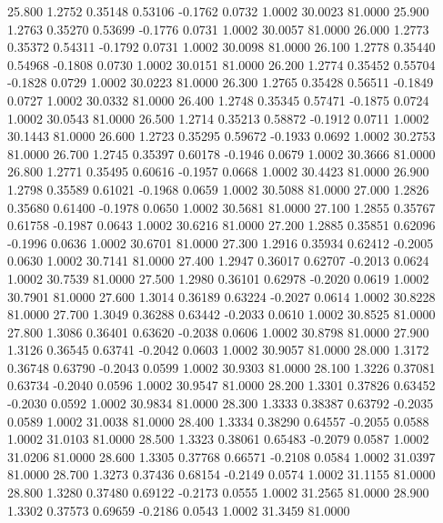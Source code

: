   25.800   1.2752   0.35148   0.53106  -0.1762   0.0732   1.0002  30.0023  81.0000
  25.900   1.2763   0.35270   0.53699  -0.1776   0.0731   1.0002  30.0057  81.0000
  26.000   1.2773   0.35372   0.54311  -0.1792   0.0731   1.0002  30.0098  81.0000
  26.100   1.2778   0.35440   0.54968  -0.1808   0.0730   1.0002  30.0151  81.0000
  26.200   1.2774   0.35452   0.55704  -0.1828   0.0729   1.0002  30.0223  81.0000
  26.300   1.2765   0.35428   0.56511  -0.1849   0.0727   1.0002  30.0332  81.0000
  26.400   1.2748   0.35345   0.57471  -0.1875   0.0724   1.0002  30.0543  81.0000
  26.500   1.2714   0.35213   0.58872  -0.1912   0.0711   1.0002  30.1443  81.0000
  26.600   1.2723   0.35295   0.59672  -0.1933   0.0692   1.0002  30.2753  81.0000
  26.700   1.2745   0.35397   0.60178  -0.1946   0.0679   1.0002  30.3666  81.0000
  26.800   1.2771   0.35495   0.60616  -0.1957   0.0668   1.0002  30.4423  81.0000
  26.900   1.2798   0.35589   0.61021  -0.1968   0.0659   1.0002  30.5088  81.0000
  27.000   1.2826   0.35680   0.61400  -0.1978   0.0650   1.0002  30.5681  81.0000
  27.100   1.2855   0.35767   0.61758  -0.1987   0.0643   1.0002  30.6216  81.0000
  27.200   1.2885   0.35851   0.62096  -0.1996   0.0636   1.0002  30.6701  81.0000
  27.300   1.2916   0.35934   0.62412  -0.2005   0.0630   1.0002  30.7141  81.0000
  27.400   1.2947   0.36017   0.62707  -0.2013   0.0624   1.0002  30.7539  81.0000
  27.500   1.2980   0.36101   0.62978  -0.2020   0.0619   1.0002  30.7901  81.0000
  27.600   1.3014   0.36189   0.63224  -0.2027   0.0614   1.0002  30.8228  81.0000
  27.700   1.3049   0.36288   0.63442  -0.2033   0.0610   1.0002  30.8525  81.0000
  27.800   1.3086   0.36401   0.63620  -0.2038   0.0606   1.0002  30.8798  81.0000
  27.900   1.3126   0.36545   0.63741  -0.2042   0.0603   1.0002  30.9057  81.0000
  28.000   1.3172   0.36748   0.63790  -0.2043   0.0599   1.0002  30.9303  81.0000
  28.100   1.3226   0.37081   0.63734  -0.2040   0.0596   1.0002  30.9547  81.0000
  28.200   1.3301   0.37826   0.63452  -0.2030   0.0592   1.0002  30.9834  81.0000
  28.300   1.3333   0.38387   0.63792  -0.2035   0.0589   1.0002  31.0038  81.0000
  28.400   1.3334   0.38290   0.64557  -0.2055   0.0588   1.0002  31.0103  81.0000
  28.500   1.3323   0.38061   0.65483  -0.2079   0.0587   1.0002  31.0206  81.0000
  28.600   1.3305   0.37768   0.66571  -0.2108   0.0584   1.0002  31.0397  81.0000
  28.700   1.3273   0.37436   0.68154  -0.2149   0.0574   1.0002  31.1155  81.0000
  28.800   1.3280   0.37480   0.69122  -0.2173   0.0555   1.0002  31.2565  81.0000
  28.900   1.3302   0.37573   0.69659  -0.2186   0.0543   1.0002  31.3459  81.0000
